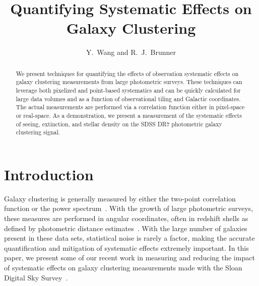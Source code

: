 
\resetcounters




\title{Quantifying Systematic Effects on Galaxy Clustering}
\author{Y.~Wang and R.~J.~Brunner \\
}


\begin{abstract}
We present techniques for quantifying the effects of observation systematic effects on galaxy clustering measurements from large photometric surveys. These techniques can leverage both pixelized and point-based systematics and can be quickly calculated for large data volumes and as a function of observational tiling and Galactic coordinates. The actual measurements are performed via a correlation function either in pixel-space or real-space. As a demonstration, we present a measurement of the systematic effects of seeing, extinction, and stellar density on the SDSS DR7 photometric galaxy clustering signal.
\end{abstract}


\section{Introduction}

Galaxy clustering is generally measured by either the two-point correlation function or the power spectrum~\citep[see, \textit{e.g.},][]{Peebles}.  With the growth of large photometric surveys, these measures are performed in angular coordinates, often in redshift shells as defined by photometric distance estimates~\citep[see, \textit{e.g.},][]{Ross07, Hayes13}. With the large number of galaxies present in these data sets, statistical noise is rarely a factor, making the accurate quantification and mitigation of systematic effects extremely important. In this paper, we present some of our recent work in measuring and reducing the impact of systematic effects on galaxy clustering measurements made with the Sloan Digital Sky Survey~\citep{York00}.

